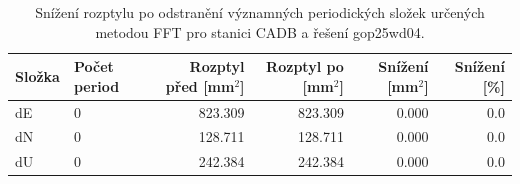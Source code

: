 \begin{table}[htbp]
\caption{Snížení rozptylu po odstranění významných periodických složek určených metodou FFT pro stanici CADB a řešení gop25wd04.}
\label{tab:gop25wd04_stcd_cadb_detr_weighted_1seg_spectral_fft_variance_reduction}
\begin{tabular}{llrrrr}
\toprule
Složka & Počet period & Rozptyl před [mm$^2$] & Rozptyl po [mm$^2$] & Snížení [mm$^2$] & Snížení [\%] \\
\midrule
dE & 0 & 823.309 & 823.309 & 0.000 & 0.0 \\
dN & 0 & 128.711 & 128.711 & 0.000 & 0.0 \\
dU & 0 & 242.384 & 242.384 & 0.000 & 0.0 \\
\bottomrule
\end{tabular}
\end{table}
